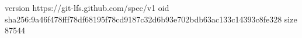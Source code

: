 version https://git-lfs.github.com/spec/v1
oid sha256:9a46f478fff78df68195f78cd9187c32d6b93e702bdb63ac133c14393c8fe328
size 87544
